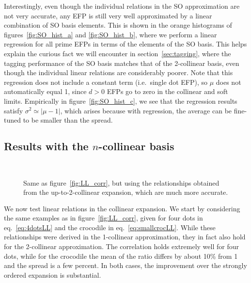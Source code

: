 \documentclass[a4paper,11pt]{article}
\newcommand{\eq}[1]{eq.~\eqref{eq:#1}}
\renewcommand{\sec}[1]{section~\ref{sec:#1}}
\newcommand{\fig}[1]{figure~\ref{fig:#1}}
\newcommand{\figs}[2]{figures~\ref{fig:#1} and \ref{fig:#2}}
\begin{document}
Interestingly, even though the individual relations in the SO approximation are not very accurate, any EFP is still very well approximated by a linear combination of SO basis elements.
%
This is shown in the orange histograms of \figs{SO_hist_a}{SO_hist_b}, where we perform a linear regression for all prime EFPs in terms of the elements of the SO basis.
%
This helps explain the curious fact we will encounter in \sec{tagging}, where the tagging performance of the SO basis matches that of the 2-collinear basis, even though the individual linear relations are considerably poorer.
%
Note that this regression does not include a constant term (i.e.~single dot EFP), so $\mu$ does not automatically equal 1, since $d>0$ EFPs go to zero in the collinear and soft limits.
%
Empirically in \fig{SO_hist_c}, we see that the regression results satisfy $\sigma^2 \simeq |\mu-1|$, which arises because with regression, the average can be fine-tuned to be smaller than the spread.


\subsection{Results with the $n$-collinear basis}
\label{sec:n-coll-basis}

     \begin{figure}[p]
     \hfill 
     \\ 
      \hfill
     \caption{Same as \fig{LL_corr}, but using the relationships obtained from the up-to-2-collinear expansion, which are much more accurate. \label{fig:corr1}}
     \end{figure}

We now test linear relations in the collinear expansion.
%
We start by considering the same examples as in \fig{LL_corr}, given for four dots in \eq{4dotsLL} and the crocodile in \eq{smallcrocLL}.
%
While these relationships were derived in the 1-collinear approximation, they in fact also hold for the 2-collinear approximation.
%
The correlation holds extremely well for four dots, while for the crocodile the mean of the ratio differs by about 10\% from 1 and the spread is a few percent.
%
In both cases, the improvement over the strongly ordered expansion is substantial.
\end{document}
